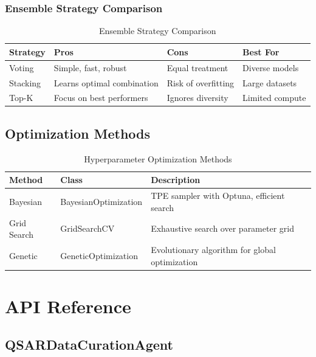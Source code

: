 \documentclass[11pt,a4paper]{article}
\begin{document}
\subsubsection{Ensemble Strategy Comparison}

\begin{table}[H]
\centering
\caption{Ensemble Strategy Comparison}
\begin{tabular}{@{}llll@{}}
\toprule
\textbf{Strategy} & \textbf{Pros} & \textbf{Cons} & \textbf{Best For} \\
\midrule
Voting & Simple, fast, robust & Equal treatment & Diverse models \\
Stacking & Learns optimal combination & Risk of overfitting & Large datasets \\
Top-K & Focus on best performers & Ignores diversity & Limited compute \\
\bottomrule
\end{tabular}
\end{table}

\subsection{Optimization Methods}

\begin{table}[H]
\centering
\caption{Hyperparameter Optimization Methods}
\begin{tabular}{@{}llp{6cm}@{}}
\toprule
\textbf{Method} & \textbf{Class} & \textbf{Description} \\
\midrule
Bayesian & BayesianOptimization & TPE sampler with Optuna, efficient search \\
Grid Search & GridSearchCV & Exhaustive search over parameter grid \\
Genetic & GeneticOptimization & Evolutionary algorithm for global optimization \\
\bottomrule
\end{tabular}
\end{table}

\section{API Reference}

\subsection{QSARDataCurationAgent}
\end{document}
